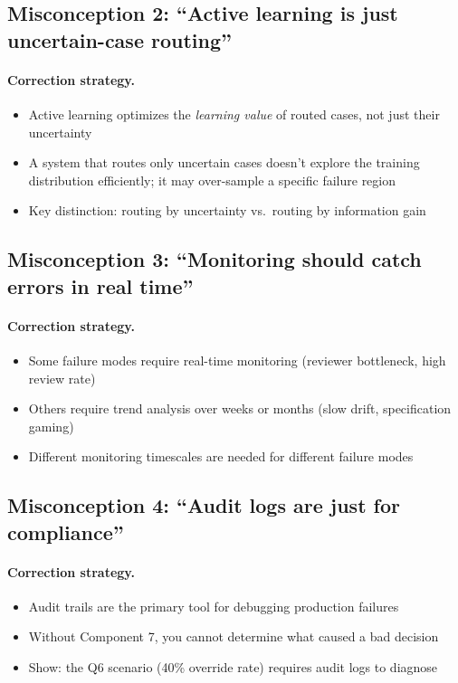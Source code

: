 \subsection{Misconception 2: ``Active learning is just uncertain-case routing''}

\paragraph{Correction strategy.}
\begin{itemize}
    \item Active learning optimizes the \emph{learning value} of routed cases, not just their uncertainty
    \item A system that routes only uncertain cases doesn't explore the training distribution efficiently; it may over-sample a specific failure region
    \item Key distinction: routing by uncertainty vs.\ routing by information gain
\end{itemize}

\subsection{Misconception 3: ``Monitoring should catch errors in real time''}

\paragraph{Correction strategy.}
\begin{itemize}
    \item Some failure modes require real-time monitoring (reviewer bottleneck, high review rate)
    \item Others require trend analysis over weeks or months (slow drift, specification gaming)
    \item Different monitoring timescales are needed for different failure modes
\end{itemize}

\subsection{Misconception 4: ``Audit logs are just for compliance''}

\paragraph{Correction strategy.}
\begin{itemize}
    \item Audit trails are the primary tool for debugging production failures
    \item Without Component 7, you cannot determine what caused a bad decision
    \item Show: the Q6 scenario (40\% override rate) requires audit logs to diagnose
\end{itemize}


